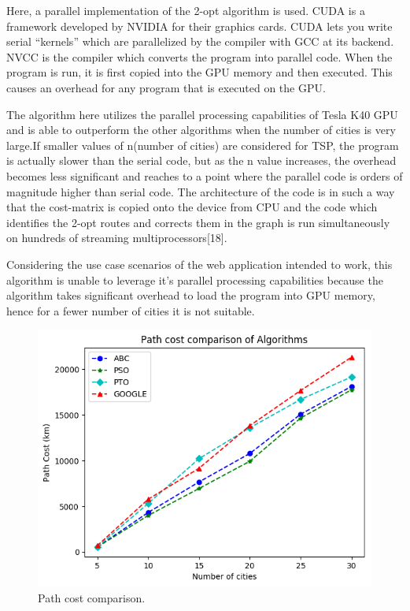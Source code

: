 \documentclass[conference]{IEEEtran}
\begin{document}
Here, a parallel implementation of the 2-opt algorithm is used. CUDA is a framework developed by NVIDIA for their graphics cards. CUDA lets you write serial “kernels” which are parallelized by the compiler with GCC at its backend. NVCC is the compiler which converts the program into parallel code. When the program is run, it is first copied into the GPU memory and then executed. This causes an overhead for any program that is executed on the GPU. 

 The algorithm here utilizes the parallel processing capabilities of Tesla K40 GPU and is able to outperform the other algorithms when the number of cities is very large.If smaller values of n(number of cities) are considered for TSP, the program is actually slower than the serial code, but as the n value increases, the overhead becomes less significant and reaches to a point where the parallel code is orders of magnitude higher than serial code. The architecture of the code is in such a way that the cost-matrix is copied onto the device from CPU and the code which identifies the 2-opt routes and corrects them in the graph is run simultaneously on hundreds of streaming multiprocessors[18]. 

 Considering the use case scenarios of the web application intended to work, this algorithm is unable to leverage it’s parallel processing capabilities because the algorithm takes significant overhead to load the program into GPU memory, hence for a fewer number of cities it is not suitable.

\begin{figure}[htbp]
\centerline{\includegraphics[width=\columnwidth]{pathcost.png}}
\caption{Path cost comparison.}
\label{fig1}
\end{figure}
\end{document}

